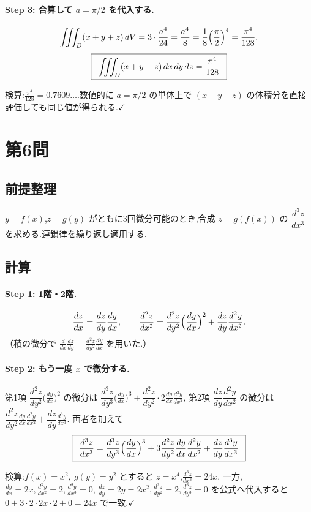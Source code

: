 \documentclass[11pt,a4paper]{article}
\begin{document}
\paragraph{Step 3: 合算して $a=\pi/2$ を代入する.}
\[
\iiint_D(x+y+z)\,dV=3\cdot\frac{a^4}{24}=\frac{a^4}{8}
=\frac{1}{8}\Bigl(\frac{\pi}{2}\Bigr)^4=\frac{\pi^4}{128}.
\]
\[
\ans{\
\displaystyle\iiint_D(x+y+z)\,dx\,dy\,dz=\frac{\pi^4}{128}\ }
\]

検算:$\frac{\pi^4}{128}=0.7609\ldots$.数値的に $a=\pi/2$ の単体上で
$(x+y+z)$ の体積分を直接評価しても同じ値が得られる.$\checkmark$

\section*{第6問}

\subsection*{前提整理}

$y=f(x)$,$z=g(y)$ がともに3回微分可能のとき,合成 $z=g(f(x))$ の
$\dfrac{d^3z}{dx^3}$ を求める.連鎖律を繰り返し適用する.

\subsection*{計算}

\paragraph{Step 1: 1階・2階.}
\[
\frac{dz}{dx}=\frac{dz}{dy}\frac{dy}{dx},\qquad
\frac{d^2z}{dx^2}=\frac{d^2z}{dy^2}\Bigl(\frac{dy}{dx}\Bigr)^2
+\frac{dz}{dy}\frac{d^2y}{dx^2}.
\]
（積の微分で $\frac{d}{dx}\frac{dz}{dy}=\frac{d^2z}{dy^2}\frac{dy}{dx}$ を用いた.）

\paragraph{Step 2: もう一度 $x$ で微分する.}
第1項 $\dfrac{d^2z}{dy^2}\bigl(\frac{dy}{dx}\bigr)^2$ の微分は
$\dfrac{d^3z}{dy^3}\bigl(\frac{dy}{dx}\bigr)^3+\dfrac{d^2z}{dy^2}\cdot2\frac{dy}{dx}\frac{d^2y}{dx^2}$,
第2項 $\dfrac{dz}{dy}\dfrac{d^2y}{dx^2}$ の微分は
$\dfrac{d^2z}{dy^2}\frac{dy}{dx}\frac{d^2y}{dx^2}+\dfrac{dz}{dy}\frac{d^3y}{dx^3}$.
両者を加えて
\[
\boxed{\,\
\frac{d^3z}{dx^3}
=\frac{d^3z}{dy^3}\Bigl(\frac{dy}{dx}\Bigr)^3
+3\frac{d^2z}{dy^2}\frac{dy}{dx}\frac{d^2y}{dx^2}
+\frac{dz}{dy}\frac{d^3y}{dx^3}\ \,}
\]

検算:$f(x)=x^2,\ g(y)=y^2$ とすると $z=x^4$,$\frac{d^3z}{dx^3}=24x$.
一方,$\frac{dy}{dx}=2x,\frac{d^2y}{dx^2}=2,\frac{d^3y}{dx^3}=0$,
$\frac{dz}{dy}=2y=2x^2,\frac{d^2z}{dy^2}=2,\frac{d^3z}{dy^3}=0$ を公式へ代入すると
$0+3\cdot2\cdot2x\cdot2+0=24x$ で一致.$\checkmark$
\end{document}
